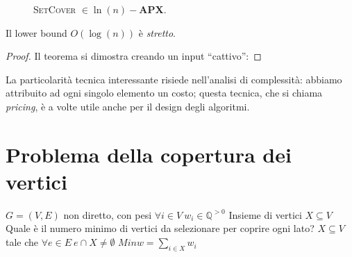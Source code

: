 \begin{figure}[h]
	\caption{\textsc{SetCover} $\in \ln(n)-\mathbf{APX}$.}
	\label{fig:setcoverapx}
\end{figure}



\begin{theorem}
	Il lower bound $O(\log(n))$ è \textit{stretto}.
\end{theorem}
\begin{proof}
	Il teorema si dimostra creando un input ``cattivo'':
\end{proof}
La particolarità tecnica interessante risiede nell'analisi di complessità:
abbiamo attribuito ad ogni singolo elemento un costo; questa tecnica, che
si chiama \textit{pricing}, è a volte utile anche per il design degli algoritmi.

\section{Problema della copertura dei vertici}
 {$G = (V,E)$ non diretto, con pesi
	$\forall i \in V ~ w_i \in \mathbb{Q}^{>0}$}
{Insieme di vertici $X \subseteq V$}
{Quale è il numero minimo di vertici da selezionare per coprire ogni lato?}
{$X \subseteq V$ tale che $\forall e \in E ~ e \cap X \neq \emptyset$}
{$Min$}{$w = \sum_{i \in X} w_i$}

